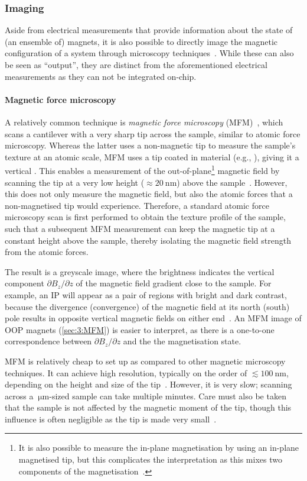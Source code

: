 \subsubsection{Imaging}
Aside from electrical measurements that provide information about the state of (an ensemble of) magnets, it is also possible to directly image the magnetic configuration of a system through microscopy techniques~\cite{freeman2001advances}.
While these can also be seen as ``output'', they are distinct from the aforementioned electrical measurements as they can not be integrated on-chip.

\paragraph{Magnetic force microscopy}
A relatively common technique is \emph{magnetic force microscopy} (MFM)~\cite{MFM}, which scans a cantilever with a very sharp tip across the sample, similar to atomic force microscopy.
Whereas the latter uses a non-magnetic tip to measure the sample's texture at an atomic scale, MFM uses a tip coated in  material (e.g., ), giving it a vertical .
This enables a measurement of the out-of-plane\footnote{
	It is also possible to measure the in-plane magnetisation by using an in-plane magnetised tip, but this complicates the interpretation as this mixes two components of the magnetisation~\cite{MFM_inplane}.
} magnetic field by scanning the tip at a very low height ($\approx \SI{20}{\nano\metre}$) above the sample~\cite{NML_Carlton,JM_Masterproef}.
However, this does not only measure the magnetic field, but also the atomic forces that a non-magnetised tip would experience.
Therefore, a standard atomic force microscopy scan is first performed to obtain the texture profile of the sample, such that a subsequent MFM measurement can keep the magnetic tip at a constant height above the sample, thereby isolating the magnetic field strength from the atomic forces. \par
The result is a greyscale image, where the brightness indicates the vertical component $\partial B_z/ \partial z$ of the magnetic field gradient close to the sample.
For example, an IP  will appear as a pair of regions with bright and dark contrast, because the divergence (convergence) of the magnetic field at its north (south) pole results in opposite vertical magnetic fields on either end~\cite{NML_Carlton}.
An MFM image of OOP magnets (\cref{sec:3:MFM}) is easier to interpret, as there is a one-to-one correspondence between $\partial B_z/ \partial z$ and the the magnetisation state. \par
MFM is relatively cheap to set up as compared to other magnetic microscopy techniques.
It can achieve high resolution, typically on the order of $\lesssim \SI{100}{\nano\metre}$, depending on the height and size of the tip~\cite{MFM}.
However, it is very slow; scanning across a $\SI{}{\micro\metre}$-sized sample can take multiple minutes.
Care must also be taken that the sample is not affected by the magnetic moment of the tip, though this influence is often negligible as the tip is made very small~\cite{Probing_MagnetoOptics}.

